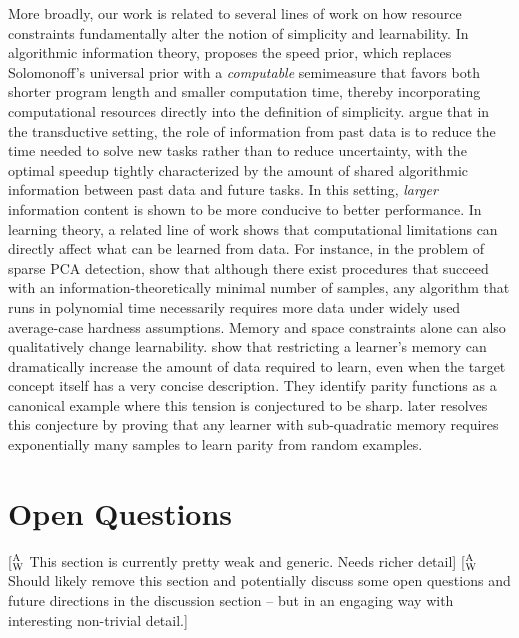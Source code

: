 \documentclass[twoside]{article}
\newcommand{\xxcomment}[4]{\textcolor{#1}{[$^{\textsc{#2}}_{\textsc{#3}}$ #4]}}
\newcommand{\agw}[1]{\xxcomment{amber}{A}{W}{#1}}
\begin{document}
More broadly, our work is related to several lines of work on how resource constraints fundamentally alter the notion of simplicity and learnability. In algorithmic information theory, \citet{schmidhuber2002speed} proposes the speed prior, which replaces Solomonoff’s universal prior with a \emph{computable} semimeasure that favors both shorter program length and smaller computation time, thereby incorporating computational resources directly into the definition of simplicity.
\citet{achille2025ai} argue that in the transductive setting, the role of information from past data is to reduce the time needed to solve new tasks rather than to reduce uncertainty, with the optimal speedup tightly characterized by the amount of shared algorithmic information between past data and future tasks.
In this setting, \emph{larger} information content is shown to be more conducive to better performance.
In learning theory, a related line of work shows that computational limitations can directly affect what can be learned from data.
For instance, in the problem of sparse PCA detection, \citet{berthet2013computational} show that although there exist procedures that succeed with an information-theoretically minimal number of samples, any algorithm that runs in polynomial time necessarily requires more data under widely used average-case hardness assumptions.
Memory and space constraints alone can also qualitatively change learnability.
\citet{steinhardt2016memory} show that restricting a learner’s memory can dramatically increase the amount of data required to learn, even when the target concept itself has a very concise description.
They identify parity functions as a canonical example where this tension is conjectured to be sharp.
\citet{raz2018fast} later resolves this conjecture by proving that any learner with sub-quadratic memory requires exponentially many samples to learn parity from random examples.


%
%
%

%
%
%
%
%
%

%

%
%
%
%
%

\iffalse

\section{Open Questions}
\agw{This section is currently pretty weak and generic. Needs richer detail} \agw{Should likely remove this section and potentially discuss some open questions and future directions in the discussion section -- but in an engaging way with interesting non-trivial detail.} 
\end{document}
